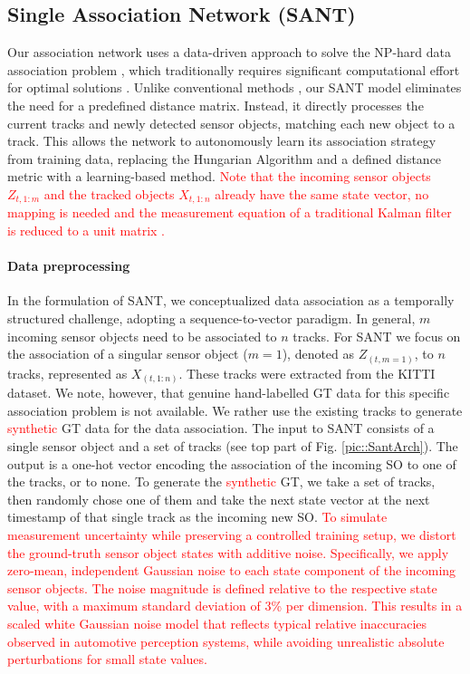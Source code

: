 \documentclass[letterpaper, 10 pt, journal, twoside]{IEEEtran}
\newcommand{\red}[1]{\textcolor{red}{#1}}
\begin{document}
\subsection{Single Association Network (SANT)}
Our association network uses a data-driven approach to solve the NP-hard data association problem {\cite{DA_hungarian.1955,DA_JPDA.1993}}, which traditionally requires significant computational effort for optimal solutions {\cite{DA_hungarian.1955}}.
Unlike conventional methods {\cite{DL_RNN_mot.2016, DL_RNN_data_association.2019}}, our \ac{SANT} model eliminates the need for a predefined distance matrix. Instead, it directly processes the current tracks and newly detected sensor objects, matching each new object to a track. This allows the network to autonomously learn its association strategy from training data, replacing the Hungarian Algorithm and a defined distance metric with a learning-based method. \red{Note that the incoming sensor objects $Z_{t,1:m}$ and the tracked objects $X_{t,1:n}$ already have the same state vector, no mapping is needed and the measurement equation of a traditional Kalman filter is reduced to a unit matrix \cite{welch2006introduction}.}

\paragraph{Data preprocessing}
In the formulation of \ac{SANT}, we conceptualized data association as a temporally structured challenge, adopting a sequence-to-vector paradigm.
In general, $m$ incoming sensor objects need to be associated to $n$ tracks.
For \ac{SANT} we focus on the association of a singular sensor object ($m=1$), denoted as $Z_{(t,m=1)}$, to $n$ tracks, represented as $X_{(t,1:n)}$.
These tracks were extracted from the KITTI dataset.
We note, however, that genuine hand-labelled \ac{GT} data for this specific association problem is not available. We rather use the existing tracks to  generate \red{synthetic} \ac{GT} data for the data association.
The input to \ac{SANT} consists of a single sensor object and a set of tracks (see top part of Fig. \ref{pic::SantArch}).
The output is a one-hot vector encoding the association of the incoming \ac{SO} to one of the tracks, or to none.
To generate the \red{synthetic} \ac{GT}, we take a set of tracks, then randomly chose one of them and take the next state vector at the next timestamp of that single track as the incoming new \ac{SO}. %
\red{To simulate measurement uncertainty while preserving a controlled training setup, we distort the ground-truth sensor object states with additive noise. Specifically, we apply zero-mean, independent Gaussian noise to each state component of the incoming sensor objects.
The noise magnitude is defined relative to the respective state value, with a maximum standard deviation of 3\% per dimension. This results in a scaled white Gaussian noise model that reflects typical relative inaccuracies observed in automotive perception systems, while avoiding unrealistic absolute perturbations for small state values.}
\end{document}
